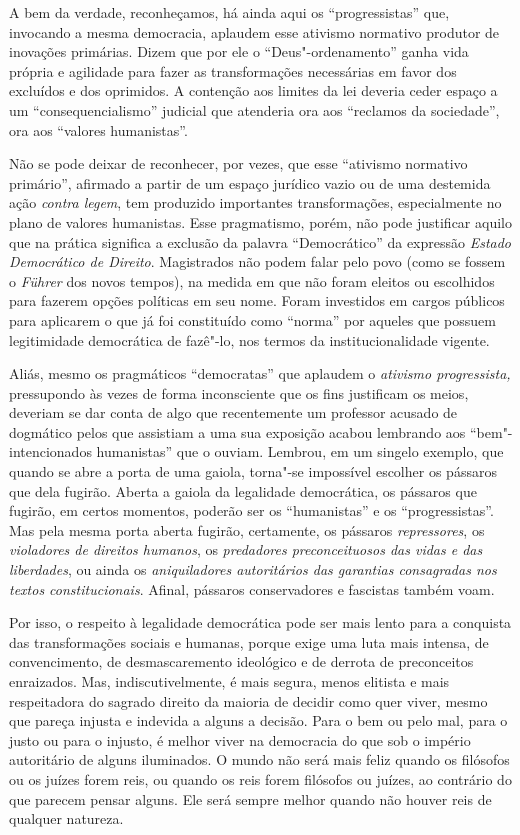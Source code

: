 A bem da verdade, reconheçamos, há ainda aqui os ``progressistas'' que,
invocando a mesma democracia, aplaudem esse ativismo normativo produtor
de inovações primárias. Dizem que por ele o ``Deus"-ordenamento''
ganha vida própria e agilidade para fazer as transformações necessárias
em favor dos excluídos e dos oprimidos. A contenção aos limites da lei
deveria ceder espaço a um ``consequencialismo'' judicial que
atenderia ora aos ``reclamos da sociedade'', ora aos
``valores humanistas''.

Não se pode deixar de reconhecer, por vezes, que esse ``ativismo
normativo primário'', afirmado a partir de um espaço jurídico vazio ou
de uma destemida ação \emph{contra legem}, tem produzido importantes
transformações, especialmente no plano de valores humanistas. Esse
pragmatismo, porém, não pode justificar aquilo que na prática significa
a exclusão da palavra ``Democrático'' da expressão \emph{Estado
Democrático de Direito}. Magistrados não podem falar pelo povo (como se
fossem o \emph{Führer} dos novos tempos), na medida em que não foram
eleitos ou escolhidos para fazerem opções políticas em seu nome. Foram
investidos em cargos públicos para aplicarem o que já foi constituído
como ``norma'' por aqueles que possuem legitimidade democrática de
fazê"-lo, nos termos da institucionalidade vigente.

Aliás, mesmo os pragmáticos ``democratas'' que aplaudem o \emph{ativismo
progressista,} pressupondo às vezes de forma inconsciente que os fins
justificam os meios, deveriam se dar conta de algo que recentemente um
professor acusado de dogmático pelos que assistiam a uma sua exposição
acabou lembrando aos ``bem"-intencionados humanistas'' que o ouviam.
Lembrou, em um singelo exemplo, que quando se abre a porta de uma
gaiola, torna"-se impossível escolher os pássaros que dela fugirão.
Aberta a gaiola da legalidade democrática, os pássaros que fugirão, em
certos momentos, poderão ser os ``humanistas'' e os
``progressistas''. Mas pela mesma porta aberta fugirão,
certamente, os pássaros \emph{repressores}, os \emph{violadores de
direitos humanos}, os \emph{predadores preconceituosos das vidas e das
liberdades}, ou ainda os \emph{aniquiladores autoritários das garantias
consagradas nos textos constitucionais}. Afinal, pássaros conservadores
e fascistas também voam.

Por isso, o respeito à legalidade democrática pode ser mais lento para a
conquista das transformações sociais e humanas, porque exige uma luta
mais intensa, de convencimento, de desmascaremento ideológico e de
derrota de preconceitos enraizados. Mas, indiscutivelmente, é mais
segura, menos elitista e mais respeitadora do sagrado direito da maioria
de decidir como quer viver, mesmo que pareça injusta e indevida a alguns
a decisão. Para o bem ou pelo mal, para o justo ou para o injusto, é
melhor viver na democracia do que sob o império autoritário de alguns
iluminados. O mundo não será mais feliz quando os filósofos ou os juízes
forem reis, ou quando os reis forem filósofos ou juízes, ao contrário do
que parecem pensar alguns. Ele será sempre melhor quando não houver reis
de qualquer natureza.

